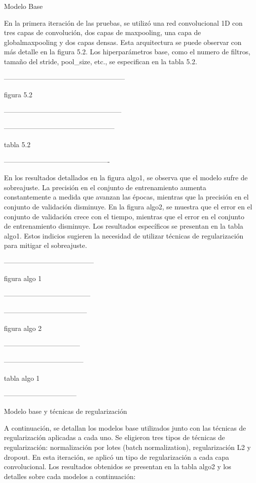 Modelo Base

En la primera iteración de las pruebas, se utilizó una red convolucional 1D con tres capas de convolución, dos capas de maxpooling, una capa de globalmaxpooling y dos capas densas. Esta arquitectura se puede observar con más detalle en la figura 5.2. Los hiperparámetros base, como el numero de filtros, tamaño del stride, pool\_size, etc., se especifican en la tabla 5.2.

-----------------------------------------------------

figura 5.2

---------------------------------------------------

------------------------------------------------

  tabla 5.2
  
  ----------------------------------------------
  
En los resultados detallados en la figura algo1, se observa que el modelo sufre de sobreajuste. La precisión en el conjunto de entrenamiento aumenta constantemente a medida que avanzan las épocas, mientras que la precisión en el conjunto de validación disminuye. En la figura algo2, se muestra que el error en el conjunto de validación crece con el tiempo, mientras que el error en el conjunto de entrenamiento disminuye. Los resultados específicos se presentan en la tabla algo1. Estos indicios sugieren la necesidad de utilizar técnicas de regularización para mitigar el sobreajuste.

---------------------------------------

figura algo 1

--------------------------------------

------------------------------------

figura algo 2

---------------------------------

-----------------------------------

tabla algo 1

--------------------------------

Modelo base y técnicas de regularización

A continuación, se detallan los modelos base utilizados junto con las técnicas de regularización aplicadas a cada uno. Se eligieron tres tipos de técnicas de regularización: normalización por lotes (batch normalization), regularización L2 y dropout. En esta iteración, se aplicó un tipo de regularización a cada capa convolucional. Los resultados obtenidos se presentan en la tabla algo2 y los detalles  sobre cada modelos a continuación:

